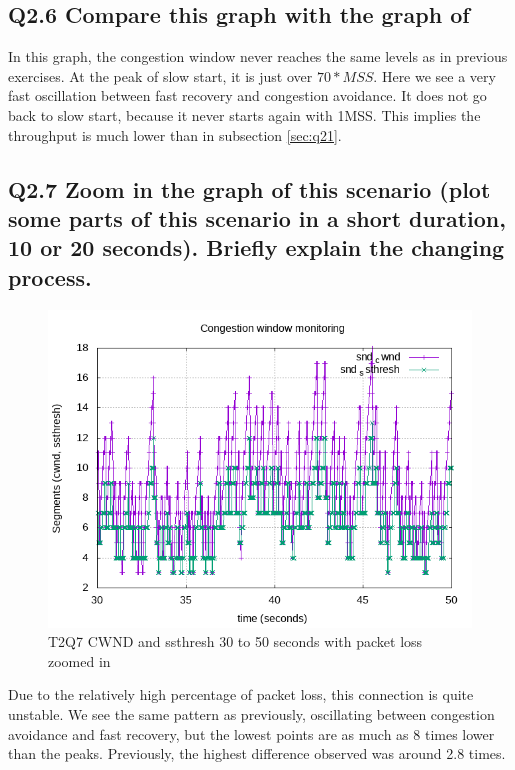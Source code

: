 \documentclass{article}
\begin{document}
\subsection{Q2.6 Compare this graph with the graph of}

In this graph, the congestion window never reaches the same levels as in
previous exercises. At the peak of slow start, it is just over $70*MSS$. Here
we see a very fast oscillation between fast recovery and congestion avoidance.
It does not go back to slow start, because it never starts again with 1MSS.
This implies the throughput is much lower than in subsection \ref{sec:q21}.


\subsection{Q2.7 Zoom in the graph of this scenario (plot some parts of this scenario in a short duration, 10 or 20 seconds). Briefly explain the changing process.}

\begin{figure}[H]
	\includegraphics{lab1-group1-task2-question7-xrange-30-50.png}
	\caption{T2Q7 CWND and ssthresh 30 to 50 seconds with packet loss zoomed in}
\end{figure}

Due to the relatively high percentage of packet loss, this connection is quite
unstable. We see the same pattern as previously, oscillating between congestion
avoidance and fast recovery, but the lowest points are as much as 8 times lower
than the peaks. Previously, the highest difference observed was around 2.8
times.
\end{document}
